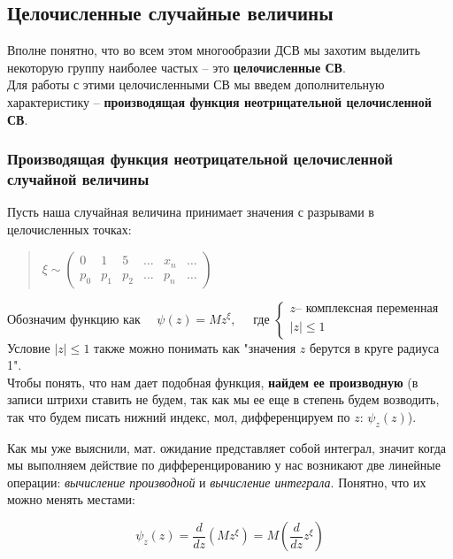 \documentclass{article}
\begin{document}
\subsection{Целочисленные случайные величины}

Вполне понятно, что во всем этом многообразии ДСВ мы захотим выделить некоторую группу наиболее частых -- это \textbf{целочисленные СВ}.
\\

Для работы с этими целочисленными СВ мы введем дополнительную характеристику -- \textbf{производящая функция неотрицательной целочисленной СВ}.

\subsubsection{Производящая функция неотрицательной целочисленной случайной величины}

Пусть наша случайная величина принимает значения с разрывами в целочисленных точках:

\begin{quote}
$\xi \sim
\begin{pmatrix}
0 & 1 & 5 & \ldots & x_n & \ldots\\
p_0 & p_1 & p_2 & \ldots & p_n & \ldots
\end{pmatrix}$
\end{quote}

Обозначим функцию как $\quad\psi(z) = Mz^\xi, \quad$ где $
\begin{cases}
z  \text{-- комплексная переменная}\\
|z| \leq 1
\end{cases}$
\\

Условие $|z| \leq 1$ также можно понимать как "значения $z$ берутся в круге радиуса 1".
\\

Чтобы понять, что нам дает подобная функция, \textbf{найдем ее производную} (в записи штрихи ставить не будем, так как мы ее еще в степень будем возводить, так что будем писать нижний индекс, мол, дифференцируем по $z$: $\psi_z(z)$).

Как мы уже выяснили, мат. ожидание представляет собой интеграл, значит когда мы выполняем действие по дифференцированию у нас возникают две линейные операции: \textit{вычисление производной} и \textit{вычисление интеграла}. Понятно, что их можно менять местами:
 
$$\psi_z(z) = \frac{d}{dz}(Mz^\xi) = M(\frac{d}{dz}z^\xi)$$
\end{document}
